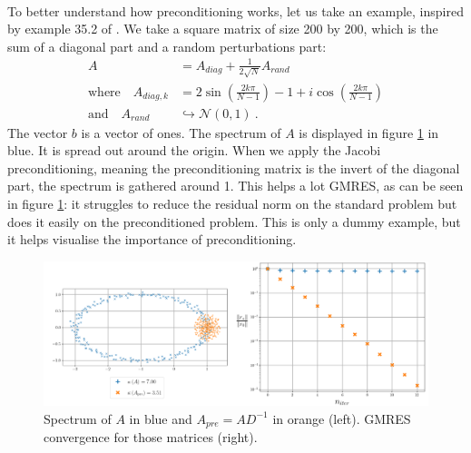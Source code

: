       \paragraph{}
       To better understand how preconditioning works, let us take an example, inspired by example 35.2 of \cite{TrefethenBau1997}.
       We take a square matrix of size 200 by 200, which is the sum of a diagonal part and a random perturbations part:
       \begin{equation}
         \begin{aligned}
           A &= A_{diag} + \frac{1}{2\sqrt{N}}A_{rand} \\
           \textrm{where}\quad A_{diag, k} &= 2\sin\left( \frac{2 k \pi}{N - 1} \right) - 1 + i \cos\left( \frac{2 k \pi}{N - 1} \right) \\
           \textrm{and}\quad A_{rand} &\hookrightarrow \mathcal{N}\left(0, 1\right) \ .
         \end{aligned}
       \end{equation}
       The vector $b$ is a vector of ones.
       The spectrum of $A$ is displayed in figure \ref{fig:preconditioning} in blue.
       It is spread out around the origin.
       When we apply the Jacobi preconditioning, meaning the preconditioning matrix is the invert of the diagonal part, the spectrum is gathered around 1.
       This helps a lot GMRES, as can be seen in figure \ref{fig:preconditioning}: it struggles to reduce the residual norm on the standard problem but does it easily on the preconditioned problem.
       This is only a dummy example, but it helps visualise the importance of preconditioning.

   		\begin{figure}
   			\centering
   			\includegraphics[width=\textwidth]{figures/preconditioning.png}
   			\caption{Spectrum of $A$ in blue and $A_{pre} = AD^{-1}$ in orange (left). GMRES convergence for those matrices (right).}
   			\label{fig:preconditioning}
   		\end{figure}

